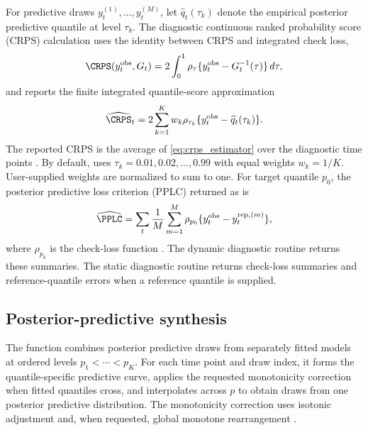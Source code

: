 For predictive draws $y_t^{(1)},\ldots,y_t^{(M)}$, let
\(\widehat q_t(\tau_k)\) denote the empirical posterior predictive quantile at
level \(\tau_k\). The diagnostic continuous ranked probability score (CRPS)
calculation uses the identity between CRPS and integrated check loss,
\[
\CRPS(y_t^{\mathrm{obs}},G_t)
=
2\int_0^1
\rho_\tau\{y_t^{\mathrm{obs}}-G_t^{-1}(\tau)\}\,d\tau,
\]
and reports the finite integrated quantile-score approximation
\begin{equation}
\widehat{\CRPS}_t
=
2\sum_{k=1}^{K}
w_k
\rho_{\tau_k}\{y_t^{\mathrm{obs}}-\widehat q_t(\tau_k)\}.
\label{eq:crps_estimator}
\end{equation}
The reported CRPS is the average of \eqref{eq:crps_estimator} over the
diagnostic time points \citep{gneiting2007,laio2007verification}. By default,
 uses
\(\tau_k=0.01,0.02,\ldots,0.99\) with equal weights \(w_k=1/K\). User-supplied
weights are normalized to sum to one. For target quantile $p_0$, the
posterior predictive loss criterion (PPLC) returned as  is
\begin{equation}
\widehat{\PPLC}
=
\sum_t
\frac{1}{M}\sum_{m=1}^M
\rho_{p_0}\{y_t^{\mathrm{obs}}-y_t^{\mathrm{rep},(m)}\},
\label{eq:pplc_estimator}
\end{equation}
where $\rho_{p_0}$ is the check-loss function \citep{gelfand1998model}.
The dynamic diagnostic routine returns these summaries. The static diagnostic
routine returns check-loss summaries and reference-quantile errors when a
reference quantile is supplied.

\subsection{Posterior-predictive synthesis}

The function  combines posterior predictive draws
from separately fitted models at ordered levels $p_1<\cdots<p_K$. For each time
point and draw index, it forms the quantile-specific predictive curve, applies
the requested monotonicity correction when fitted quantiles cross, and
interpolates across $p$ to obtain draws from one posterior predictive
distribution. The monotonicity correction uses isotonic adjustment and, when
requested, global monotone rearrangement \citep{barlow1972,chernozhukov2010}.

